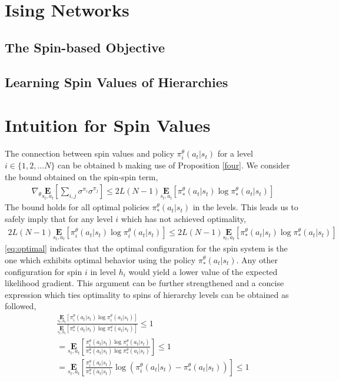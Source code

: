 \documentclass{article}
\begin{document}
\section{Ising Networks}

\subsection{The Spin-based Objective}

\subsection{Learning Spin Values of Hierarchies}

\section{Intuition for Spin Values}
The connection between spin values and policy $\pi^{\theta}_{i}(a_{t}|s_{t})$ for a level $i \in \{1,2,...N\}$ can be obtained b making use of Proposition \autoref{four}. We consider the bound obtained on the spin-spin term,
\begin{gather}
    \nabla_{\theta}\underset{s_{t},a_{t}}{\textbf{E}}[\sum_{i,j}\sigma^{\pi_{i}}\sigma^{\pi_{j}}] \leq 2L(N-1)\underset{s_{t},a_{t}}{\textbf{E}}[\pi^{\theta}_{*}(a_{t}|s_{t})\log \pi^{\theta}_{*}(a_{t}|s_{t})] \nonumber
\end{gather} 
The bound holds for all optimal policies $\pi^{\theta}_{*}(a_{t}|s_{t})$ in the levels. This leads us to safely imply that for any level $i$ which has not achieved optimality,
\begin{gather}
    2L(N-1)\underset{s_{t},a_{t}}{\textbf{E}}[\pi^{\theta}_{i}(a_{t}|s_{t})\log \pi^{\theta}_{i}(a_{t}|s_{t})] \leq 2L(N-1)\underset{s_{t},a_{t}}{\textbf{E}}[\pi^{\theta}_{*}(a_{t}|s_{t})\log \pi^{\theta}_{*}(a_{t}|s_{t})]  \label{eq:optimal}
\end{gather} 
\autoref{eq:optimal} indicates that the optimal configuration for the spin system is the one which exhibits optimal behavior using the policy $\pi^{\theta}_{*}(a_{t}|s_{t})$. Any other configuration for spin $i$ in level $h_{i}$ would yield a lower value of the expected likelihood gradient. This argument can be further strengthened and a concise expression which ties optimality to spins of hierarchy levels can be obtained as followed,
\begin{gather}
    \frac{\underset{s_{t},a_{t}}{\textbf{E}}[\pi^{\theta}_{i}(a_{t}|s_{t})\log \pi^{\theta}_{i}(a_{t}|s_{t})]}{\underset{s_{t},a_{t}}{\textbf{E}}[\pi^{\theta}_{*}(a_{t}|s_{t})\log \pi^{\theta}_{*}(a_{t}|s_{t})]} \leq 1 \nonumber \\
    = \underset{s_{t},a_{t}}{\textbf{E}}[\frac{\pi^{\theta}_{i}(a_{t}|s_{t})\log \pi^{\theta}_{i}(a_{t}|s_{t})}{\pi^{\theta}_{*}(a_{t}|s_{t})\log \pi^{\theta}_{*}(a_{t}|s_{t})}] \leq 1 \nonumber \\
    = \underset{s_{t},a_{t}}{\textbf{E}}[\frac{\pi^{\theta}_{i}(a_{t}|s_{t})}{\pi^{\theta}_{*}(a_{t}|s_{t})}\log(\pi^{\theta}_{i}(a_{t}|s_{t}) - \pi^{\theta}_{*}(a_{t}|s_{t}))] \leq 1 \label{eq:connect}    
\end{gather}
\end{document}
